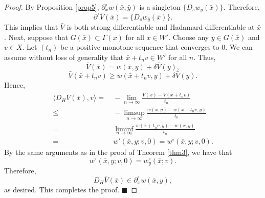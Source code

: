 \documentclass[10pt,a4paper]{amsart}
\begin{document}
\begin{proof}
By Proposition \ref{prop5}, $\partial^{\circ}_xw(\bar{x},\bar{y})$ is a singleton $\{D_sw_{\bar{y}}(\bar{x})\}$. Therefore,
\[\partial^{\circ}\bar{V}(\bar{x})=\{D_sw_{\bar{y}}(\bar{x})\}.\]
This implies that $\bar{V}$ is both strong differentiable and Hadamard differentiable at $\bar{x}$. Next, suppose that $G(\bar{x})\subset \Gamma(x)$ for all $x\in W'$. Choose any $y\in G(\bar{x})$ and $v\in X$. Let $(t_n)$ be a positive monotone sequence that converges to $0$. We can assume without loss of generality that $\bar{x}+t_nv\in W'$ for all $n$. Thus,
\[\bar{V}(\bar{x})=w(\bar{x},y)+\delta \bar{V}(y),\]
\[\bar{V}(\bar{x}+t_nv)\ge w(\bar{x}+t_nv,y)+\delta \bar{V}(y).\]
Hence,
\begin{align*}
\langle D_H\bar{V}(\bar{x}),v\rangle=&~-\lim_{n\to \infty}\frac{\bar{V}(\bar{x})-\bar{V}(\bar{x}+t_nv)}{t_n}\\
\le&~-\limsup_{n\to \infty}\frac{w(\bar{x},y)-w(\bar{x}+t_nv,y)}{t_n}\\
=&~\liminf_{n\to \infty}\frac{w(\bar{x}+t_nv,y)-w(\bar{x},y)}{t_n}\\
=&~w'(\bar{x},y;v,0)=w^{\circ}(\bar{x},y;v,0).
\end{align*}
By the same arguments as in the proof of Theorem \ref{thm3}, we have that
\[w^{\circ}(\bar{x},y;v,0)=w_y^{\circ}(\bar{x};v).\]
Therefore,
\[D_H\bar{V}(\bar{x})\in \partial^{\circ}_xw(\bar{x},y),\]
as desired. This completes the proof. $\blacksquare$
\end{proof}
\end{document}
